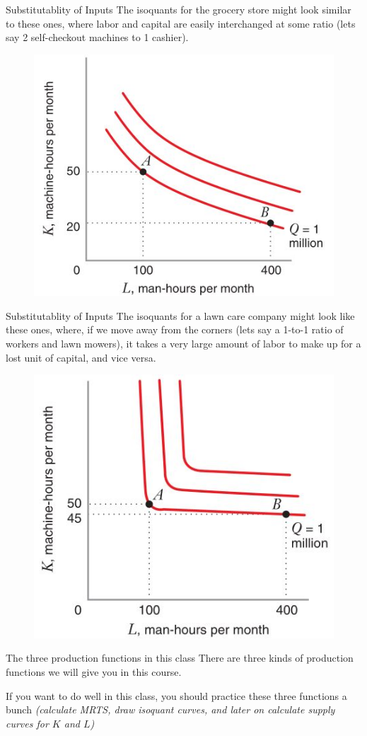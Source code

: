 \documentclass[11pt,t]{beamer}
\begin{document}
\begin{frame}{Substitutablity of Inputs}
  The isoquants for the grocery store might look similar to these ones, where labor and capital are easily interchanged at some ratio (lets say 2 self-checkout machines to 1 cashier).

  \begin{figure}
    \includegraphics[width=0.6\linewidth]{figures/fig6_11b.jpg}
  \end{figure}
\end{frame}

\begin{frame}{Substitutablity of Inputs}
  The isoquants for a lawn care company might look like these ones, where, if we move away from the corners (lets say a 1-to-1 ratio of workers and lawn mowers), it takes a very large amount of labor to make up for a lost unit of capital, and vice versa.

  \begin{figure}
    \includegraphics[width=0.5\linewidth]{figures/fig6_11a.jpg}
  \end{figure}
\end{frame}

\begin{frame}{The three  production functions in this class}
    There are three kinds of production functions we will give you in this course. 
    
    \bigskip\bigskip
    If you want to do well in this class, you should practice these three functions a bunch \emph{(calculate MRTS, draw isoquant curves, and later on calculate supply curves for $K$ and $L$)}
\end{frame}
\end{document}
